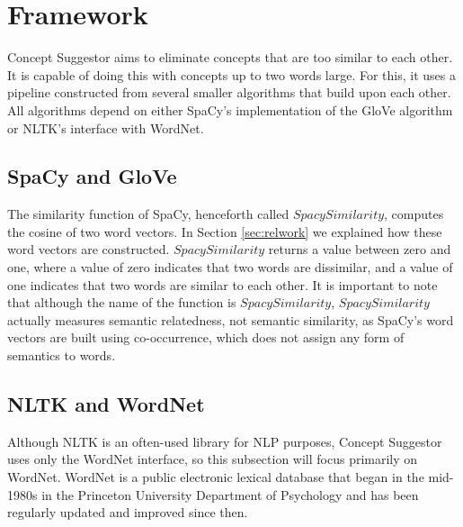 \documentclass{article}
\begin{document}

\section{Framework} \label{sec:framework}

Concept Suggestor aims to eliminate concepts that are too similar to each other. It is capable of doing this with concepts up to two words large. For this, it uses a pipeline constructed from several smaller algorithms that build upon each other. All algorithms depend on either SpaCy's implementation of the GloVe algorithm or NLTK's interface with WordNet.

\subsection{SpaCy and GloVe}
The similarity function of SpaCy, henceforth called $\textit{SpacySimilarity}$, computes the cosine of two word vectors. In Section \ref{sec:relwork} we explained how these word vectors are constructed. $\textit{SpacySimilarity}$ returns a value between zero and one, where a value of zero indicates that two words are dissimilar, and a value of one indicates that two words are similar to each other. It is important to note that although the name of the function is $\textit{SpacySimilarity}$, $\textit{SpacySimilarity}$ actually measures semantic relatedness, not semantic similarity, as SpaCy's word vectors are built using co-occurrence, which does not assign any form of semantics to words. 

\subsection{NLTK and WordNet}
Although NLTK is an often-used library for NLP purposes, Concept Suggestor uses only the WordNet interface, so this subsection will focus primarily on WordNet. WordNet is a public electronic lexical database that began in the mid-1980s in the Princeton University Department of Psychology and has been regularly updated and improved since then. 
\end{document}

